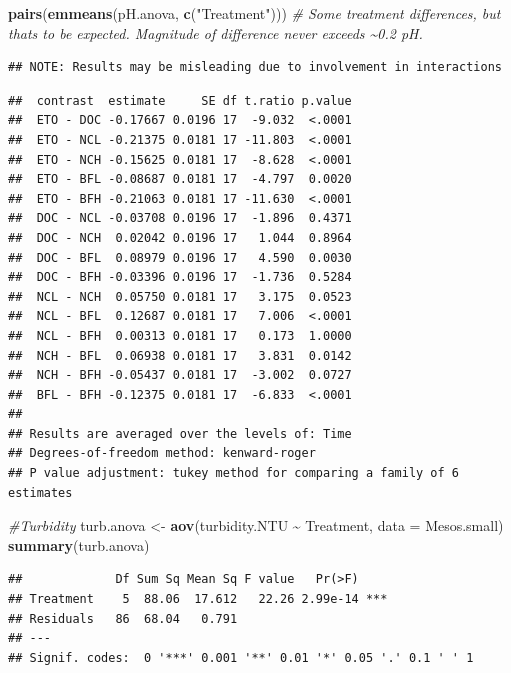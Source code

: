 \documentclass[
]{article}
\newenvironment{Shaded}{\begin{snugshade}}{\end{snugshade}}
\newcommand{\AttributeTok}[1]{\textcolor[rgb]{0.13,0.29,0.53}{#1}}
\newcommand{\CommentTok}[1]{\textcolor[rgb]{0.56,0.35,0.01}{\textit{#1}}}
\newcommand{\FunctionTok}[1]{\textcolor[rgb]{0.13,0.29,0.53}{\textbf{#1}}}
\newcommand{\NormalTok}[1]{#1}
\newcommand{\OtherTok}[1]{\textcolor[rgb]{0.56,0.35,0.01}{#1}}
\newcommand{\SpecialCharTok}[1]{\textcolor[rgb]{0.81,0.36,0.00}{\textbf{#1}}}
\newcommand{\StringTok}[1]{\textcolor[rgb]{0.31,0.60,0.02}{#1}}
\begin{document}
\begin{Shaded}
\begin{Highlighting}[]
\FunctionTok{pairs}\NormalTok{(}\FunctionTok{emmeans}\NormalTok{(pH.anova, }\FunctionTok{c}\NormalTok{(}\StringTok{"Treatment"}\NormalTok{))) }\CommentTok{\# Some treatment differences, but that\textquotesingle{}s to be expected. Magnitude of difference never exceeds \textasciitilde{}0.2 pH.}
\end{Highlighting}
\end{Shaded}

\begin{verbatim}
## NOTE: Results may be misleading due to involvement in interactions
\end{verbatim}

\begin{verbatim}
##  contrast  estimate     SE df t.ratio p.value
##  ETO - DOC -0.17667 0.0196 17  -9.032  <.0001
##  ETO - NCL -0.21375 0.0181 17 -11.803  <.0001
##  ETO - NCH -0.15625 0.0181 17  -8.628  <.0001
##  ETO - BFL -0.08687 0.0181 17  -4.797  0.0020
##  ETO - BFH -0.21063 0.0181 17 -11.630  <.0001
##  DOC - NCL -0.03708 0.0196 17  -1.896  0.4371
##  DOC - NCH  0.02042 0.0196 17   1.044  0.8964
##  DOC - BFL  0.08979 0.0196 17   4.590  0.0030
##  DOC - BFH -0.03396 0.0196 17  -1.736  0.5284
##  NCL - NCH  0.05750 0.0181 17   3.175  0.0523
##  NCL - BFL  0.12687 0.0181 17   7.006  <.0001
##  NCL - BFH  0.00313 0.0181 17   0.173  1.0000
##  NCH - BFL  0.06938 0.0181 17   3.831  0.0142
##  NCH - BFH -0.05437 0.0181 17  -3.002  0.0727
##  BFL - BFH -0.12375 0.0181 17  -6.833  <.0001
## 
## Results are averaged over the levels of: Time 
## Degrees-of-freedom method: kenward-roger 
## P value adjustment: tukey method for comparing a family of 6 estimates
\end{verbatim}

\begin{Shaded}
\begin{Highlighting}[]
\CommentTok{\#Turbidity}
\NormalTok{turb.anova }\OtherTok{\textless{}{-}} \FunctionTok{aov}\NormalTok{(turbidity.NTU }\SpecialCharTok{\textasciitilde{}}\NormalTok{ Treatment, }\AttributeTok{data =}\NormalTok{ Mesos.small)}
\FunctionTok{summary}\NormalTok{(turb.anova)}
\end{Highlighting}
\end{Shaded}

\begin{verbatim}
##             Df Sum Sq Mean Sq F value   Pr(>F)    
## Treatment    5  88.06  17.612   22.26 2.99e-14 ***
## Residuals   86  68.04   0.791                     
## ---
## Signif. codes:  0 '***' 0.001 '**' 0.01 '*' 0.05 '.' 0.1 ' ' 1
\end{verbatim}
\end{document}
